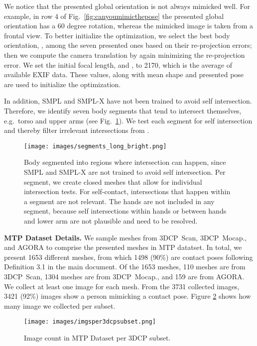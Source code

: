 \documentclass[final]{cvpr}
\newcommand{\mtp}{\mbox{MTP}\xspace}
\newcommand{\threedcp}{\mbox{3DCP}\xspace}
\newcommand{\threedcpscan}{\mbox{3DCP Scan}\xspace}
\newcommand{\threedcpmocap}{\mbox{3DCP Mocap.}\xspace}
\theoremstyle{definition}
\begin{document}
We notice that the presented global orientation is not always mimicked well. For example, in row 4 of Fig.~\ref{fig:canyoumimicthepose} the presented global orientation has a 60 degree rotation, whereas the mimicked image is taken from a frontal view.
To better initialize the optimization, we select the best body orientation, , among the seven presented ones based on their re-projection errors; then we compute the camera translation by again minimizing the re-projection error.
We set the initial focal length,  and , to 2170, which is the average of available EXIF data. 
These values, along with mean shape and presented pose are used to initialize the optimization.


In addition, SMPL and SMPL-X have not been trained to avoid self intersection.
Therefore, we identify seven body segments that tend to intersect themselves, e.g.~torso and upper arms (see Fig.~\ref{fig:segments}). We test each segment for self intersection and thereby filter irrelevant intersections from .

\begin{figure}
\centerline{		\texttt{[image: images/segments\_long\_bright.png]}}
\vspace{-0.04in}
	\caption{Body segmented into regions where intersection can happen, since SMPL and SMPL-X are not trained to avoid self intersection. Per segment, we create closed meshes that allow for individual intersection tests. For self-contact, intersections that happen within a segment are not relevant. The hands are not included in any segment, because self intersections within hands or between hands and lower arm are not plausible and need to be resolved.}
	\label{fig:segments}
\end{figure}

\textbf{MTP Dataset Details.} 
We sample meshes from \threedcpscan, \threedcpmocap, and AGORA \cite{patel2021agora} to comprise the presented meshes in \mtp datatset. 
In total, we present 1653 different meshes, from which 1498 (90\%) are contact poses following Definition 3.1 in the main document. 
Of the 1653 meshes, 110 meshes are from \threedcpscan, 1304 meshes are from \threedcpmocap, and 159 are from AGORA. 
We collect at least one image for each mesh.
From the 3731 collected images, 3421 (92\%) images show a person mimicking a contact pose. 
Figure \ref{fig:imgsper3dcpsubset} shows how many image we collected per subset.
\begin{figure}
\centerline{		\texttt{[image: images/imgsper3dcpsubset.png]}}
\vspace{-0.04in}
	\caption{Image count in MTP Dataset per \threedcp subset.}
	\label{fig:imgsper3dcpsubset}
\end{figure}
\end{document}
